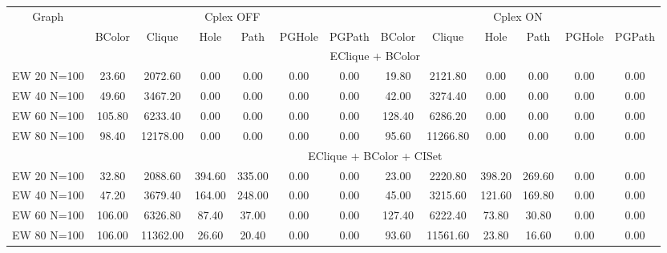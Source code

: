 \begin{sidewaystable}[h]
\centering

\begin{tabular}{|c|cccccc|cccccc|}
\hline
\multicolumn{1}{|c|}{Graph} & \multicolumn{6}{|c|}{Cplex OFF} & \multicolumn{6}{|c|}{Cplex ON} \\
 & BColor & Clique & Hole & Path & PGHole & PGPath & BColor & Clique & Hole & Path & PGHole & PGPath \\
\hline
\multicolumn{1}{|c|}{} & \multicolumn{12}{|c|}{EClique + BColor} \\
\hline
EW 20 N=100 & 23.60 & 2072.60 & 0.00 & 0.00 & 0.00 & 0.00 & 19.80 & 2121.80 & 0.00 & 0.00 & 0.00 & 0.00
\\
EW 40 N=100 & 49.60 & 3467.20 & 0.00 & 0.00 & 0.00 & 0.00 & 42.00 & 3274.40 & 0.00 & 0.00 & 0.00 & 0.00
\\
EW 60 N=100 & 105.80 & 6233.40 & 0.00 & 0.00 & 0.00 & 0.00 & 128.40 & 6286.20 & 0.00 & 0.00 & 0.00 & 0.00
\\
EW 80 N=100 & 98.40 & 12178.00 & 0.00 & 0.00 & 0.00 & 0.00 & 95.60 & 11266.80 & 0.00 & 0.00 & 0.00 & 0.00
\\
\hline 
\multicolumn{1}{|c|}{} & \multicolumn{12}{|c|}{EClique + BColor + CISet} \\
\hline
EW 20 N=100 & 32.80 & 2088.60 & 394.60 & 335.00 & 0.00 & 0.00 & 23.00 & 2220.80 & 398.20 & 269.60 & 0.00 & 0.00
\\
EW 40 N=100 & 47.20 & 3679.40 & 164.00 & 248.00 & 0.00 & 0.00 & 45.00 & 3215.60 & 121.60 & 169.80 & 0.00 & 0.00
\\
EW 60 N=100 & 106.00 & 6326.80 & 87.40 & 37.00 & 0.00 & 0.00 & 127.40 & 6222.40 & 73.80 & 30.80 & 0.00 & 0.00
\\
EW 80 N=100 & 106.00 & 11362.00 & 26.60 & 20.40 & 0.00 & 0.00 & 93.60 & 11561.60 & 23.80 & 16.60 & 0.00 & 0.00
\\

\end{tabular}
\end{sidewaystable}
